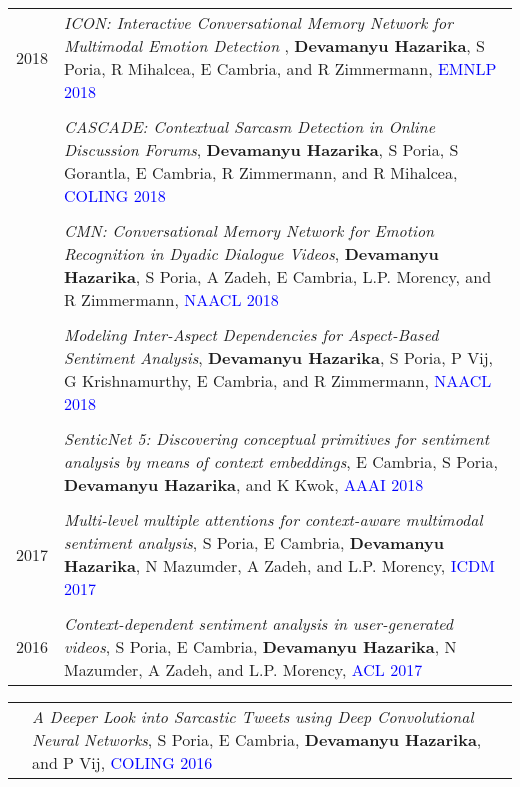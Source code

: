 \documentclass[a4paper,10pt]{article}
\begin{document}
\begin{tabular}{R{1cm}| L{12cm}}
    2018 & \textit{ICON: Interactive Conversational Memory Network for Multimodal Emotion Detection} ,  \small{\textbf{Devamanyu Hazarika}, S Poria, R Mihalcea, E Cambria, and R Zimmermann},  \textcolor{blue}{\textsc{EMNLP 2018}}\\
    \\
    & \textit{CASCADE: Contextual Sarcasm Detection in Online Discussion Forums},  \small{\textbf{Devamanyu Hazarika}, S Poria, S Gorantla, E Cambria, R Zimmermann, and R Mihalcea},  \textcolor{blue}{\textsc{COLING 2018}}
    \\
    \\
    & \textit{CMN: Conversational Memory Network for Emotion Recognition in Dyadic Dialogue Videos},  \small{\textbf{Devamanyu Hazarika}, S Poria, A Zadeh, E Cambria, L.P. Morency, and R Zimmermann},  \textcolor{blue}{\textsc{NAACL 2018}}\\
    \\
    & \textit{Modeling Inter-Aspect Dependencies for Aspect-Based Sentiment Analysis},  \small{\textbf{Devamanyu Hazarika}, S Poria, P Vij, G Krishnamurthy, E Cambria, and R Zimmermann},  \textcolor{blue}{\textsc{NAACL 2018}}\\
    \\
    & \textit{SenticNet 5: Discovering conceptual primitives for sentiment analysis by means of context embeddings},  \small{E Cambria, S Poria, \textbf{Devamanyu Hazarika}, and K Kwok},  \textcolor{blue}{\textsc{AAAI 2018}}\\
    \\
    2017 & \textit{Multi-level multiple attentions for context-aware multimodal sentiment analysis},  \small{S Poria, E Cambria, \textbf{Devamanyu Hazarika}, N Mazumder, A Zadeh, and L.P. Morency},  \textcolor{blue}{\textsc{ICDM 2017}}\\
    \\
    2016 & \textit{Context-dependent sentiment analysis in user-generated videos},  \small{S Poria, E Cambria, \textbf{Devamanyu Hazarika}, N Mazumder, A Zadeh, and L.P. Morency},  \textcolor{blue}{\textsc{ACL 2017}}\\
\end{tabular}
    
\begin{tabular}{R{1cm}| L{12cm}}
    & \textit{A Deeper Look into Sarcastic Tweets using Deep Convolutional Neural Networks},  \small{S Poria, E Cambria, \textbf{Devamanyu Hazarika}, and P Vij},  \textcolor{blue}{\textsc{COLING 2016}}
\end{tabular}
\end{document}
